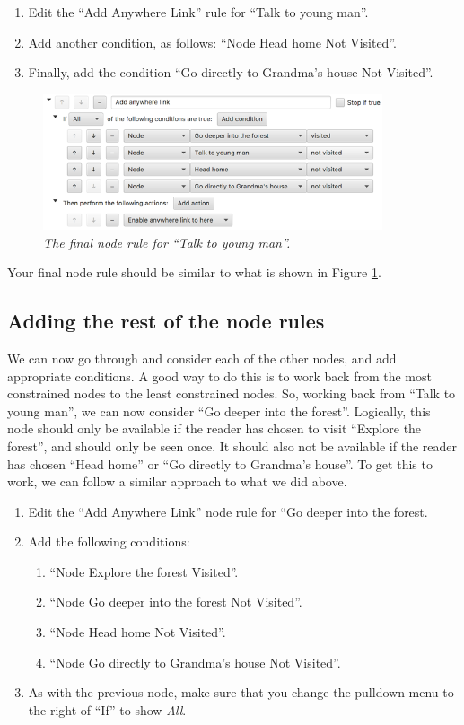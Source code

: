 \documentclass{article}
\begin{document}
\begin{enumerate}
  \item Edit the ``Add Anywhere Link'' rule for ``Talk to young man''.
  \item Add another condition, as follows: ``Node Head home Not
  Visited''.
  \item Finally, add the condition ``Go directly to Grandma's house Not
  Visited''.
\end{enumerate}

\begin{figure}[h]
  \centering
  \includegraphics[width=10cm]{images/hypedyn-tutorial-3-figure-7}
  \caption{\textit{The final node rule for ``Talk to young man''.}}
  \label{fig:tut3:talk_final}
\end{figure} 

Your final node rule should be similar to what is shown in Figure
\ref{fig:tut3:talk_final}.

\subsection{Adding the rest of the node rules}

We can now go through and consider each of the other nodes, and add appropriate conditions. A good way to do this is to work back from the most constrained nodes to the least constrained nodes. So, working back from ``Talk to young man'', we can now consider ``Go deeper into the forest''. Logically, this node should only be available if the reader has chosen to visit ``Explore the forest'', and should only be seen once. It should also not be available if the reader has chosen ``Head home'' or ``Go directly to Grandma's house''. To get this to work, we can follow a similar approach to what we did above.

\begin{enumerate}
  \item Edit the ``Add Anywhere Link'' node rule for ``Go deeper into the
  forest.
  \item Add the following conditions:
  \begin{enumerate}
  \item ``Node Explore the forest Visited''.
  \item ``Node Go deeper into the forest Not Visited''.
  \item ``Node Head home Not Visited''.
  \item ``Node Go directly to Grandma's house Not Visited''.
  \end{enumerate}
\item As with the previous node, make sure that you change the pulldown menu to the right of ``If'' to show \textit{All}.
\end{enumerate}
\end{document}

